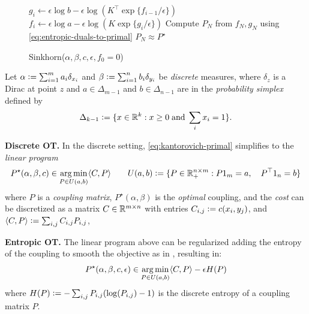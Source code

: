 \documentclass{article}
\newcommand{\defeq}{\vcentcolon=}
\begin{document}
\begin{figure}
  \vspace{-11mm}
  \begin{minipage}{0.5\textwidth}
    \begin{algorithm}[H]
      \caption{\footnotesize Sinkhorn($\alpha, \beta, c, \epsilon, f_0=0$)}
      \begin{algorithmic}
        \footnotesize
        \State $g_{i} \leftarrow \epsilon \log b - \epsilon\log\left(
          K^\top \exp\{f_{i-1}/\epsilon\}\right)$
        \State $f_{i} \leftarrow \epsilon \log a - \epsilon\log\left(
          K \exp\{g_i/\epsilon\}\right)$
        \EndFor
        \State Compute $P_N$ from $f_N,g_N$ using \cref{eq:entropic-duals-to-primal}
        \State\Return $P_N\approx P^\star$
      \end{algorithmic}
      \label{alg:sinkhorn}
    \end{algorithm}
  \end{minipage}
  \vspace{-6mm}
\end{figure}
Let $\alpha\defeq\sum_{i=1}^m a_i\delta_{x_i}$ and
$\beta\defeq\sum_{i=1}^n b_i\delta_{y_i}$
be
\emph{discrete} measures,
where $\delta_z$ is a Dirac at point $z$
and $a\in\Delta_{m-1}$ and $b\in\Delta_{n-1}$ are
in the \emph{probability simplex} defined by
\begin{equation}
  \label{eq:simplex}
  \Delta_{k-1}\defeq\{x\in \R^k : x\geq 0\; {\rm and}\; \sum_i x_i=1\}.
  \footnotesize
\end{equation}

\textbf{Discrete OT.}
In the discrete setting,
\cref{eq:kantorovich-primal} simplifies to the \emph{linear program}
\begin{equation}
  P^\star(\alpha,\beta,c)\in \argmin_{P\in U(a,b)} \langle C, P \rangle \qquad
  U(a, b)\defeq \{P\in\R_+^{n\times m} : P 1_m = a,\quad P^\top 1_n = b\}
  \label{eq:discrete-primal}
\end{equation}
where $P$ is a \emph{coupling matrix},
$P^\star(\alpha, \beta)$ is the \emph{optimal} coupling,
and the \emph{cost} can be discretized as a matrix $C\in\mathbb{R}^{m\times n}$ with entries
$C_{i,j}\defeq c(x_i, y_j)$, and
$\langle C, P\rangle \defeq \sum_{i,j}C_{i,j}P_{i,j}$,

\textbf{Entropic OT.}
The linear program above can be regularized adding the entropy
of the coupling to smooth the objective as in
\citet{cominetti1994asymptotic,cuturi2013sinkhorn},
resulting in:
\begin{equation}
  P^\star(\alpha,\beta,c,\epsilon)\in \operatorname*{arg\,min}_{P\in U(a,b)} \langle C, P \rangle - \epsilon H(P)
  \label{eq:entropic-primal}
\end{equation}
where $H(P)\defeq -\sum_{i,j} P_{i,j}(\log(P_{i,j})-1)$
is the discrete entropy of a coupling matrix $P$.
\end{document}
